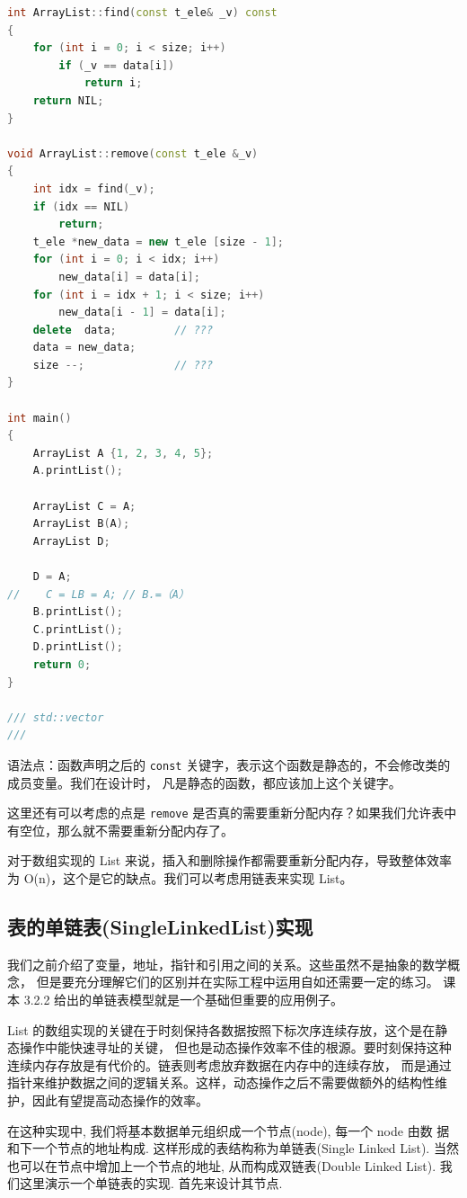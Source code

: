 \documentclass[a4paper]{ctexart}
\theoremstyle{definition}
\theoremstyle{definition}
\begin{document}
\begin{lstlisting}[language=C++]
int ArrayList::find(const t_ele& _v) const
{
    for (int i = 0; i < size; i++)
        if (_v == data[i])
            return i;
    return NIL;
}

void ArrayList::remove(const t_ele &_v)
{
    int idx = find(_v);
    if (idx == NIL)
        return;
    t_ele *new_data = new t_ele [size - 1];
    for (int i = 0; i < idx; i++)
        new_data[i] = data[i];
    for (int i = idx + 1; i < size; i++)
        new_data[i - 1] = data[i];
    delete  data;         // ???
    data = new_data;
    size --;              // ???
}

int main()
{
    ArrayList A {1, 2, 3, 4, 5};
    A.printList();

    ArrayList C = A;
    ArrayList B(A);
    ArrayList D;

    D = A;
//    C = LB = A; // B.=（A）
    B.printList();
    C.printList();
    D.printList();
    return 0;
}

/// std::vector 
///    
\end{lstlisting}

语法点：函数声明之后的 \verb|const| 关键字，表示这个函数是静态的，不会修改类的成员变量。我们在设计时，
凡是静态的函数，都应该加上这个关键字。

这里还有可以考虑的点是 \verb|remove| 是否真的需要重新分配内存？如果我们允许表中有空位，那么就不需要重新分配内存了。

对于数组实现的 List 来说，插入和删除操作都需要重新分配内存，导致整体效率为 O(n)，这个是它的缺点。我们可以考虑用链表来实现 List。

\subsection{表的单链表(SingleLinkedList)实现}
我们之前介绍了变量，地址，指针和引用之间的关系。这些虽然不是抽象的数学概念，
但是要充分理解它们的区别并在实际工程中运用自如还需要一定的练习。
课本 3.2.2 给出的单链表模型就是一个基础但重要的应用例子。

List 的数组实现的关键在于时刻保持各数据按照下标次序连续存放，这个是在静态操作中能快速寻址的关键，
但也是动态操作效率不佳的根源。要时刻保持这种连续内存存放是有代价的。链表则考虑放弃数据在内存中的连续存放，
而是通过指针来维护数据之间的逻辑关系。这样，动态操作之后不需要做额外的结构性维护，因此有望提高动态操作的效率。

在这种实现中, 我们将基本数据单元组织成一个节点(node), 每一个 node 由数
据和下一个节点的地址构成. 这样形成的表结构称为单链表(Single Linked
List). 当然也可以在节点中增加上一个节点的地址, 从而构成双链表(Double
Linked List). 我们这里演示一个单链表的实现. 首先来设计其节点.
\end{document}
